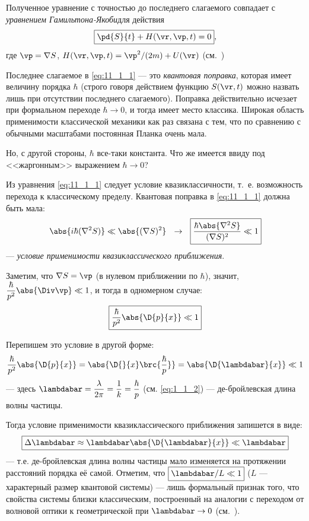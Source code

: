 Полученное уравнение с точностью до последнего слагаемого совпадает с {\em уравнением Гамильтона-Якоби}\footnotemark для действия
$$
\boxed{\pd{S}{t} + H(\vr,\vp,t) = 0},
$$
где $\vp=\nabla S$, $H(\vr,\vp,t) = {\vp^2}/{(2m)} + U(\vr)$ (см.~)

Последнее слагаемое в \eqref{eq:11_1_1} --- это {\em квантовая поправка}, которая имеет величину порядка $\hbar$ (строго говоря действием функцию $S(\vr, t)$ можно назвать лишь при отсутствии последнего слагаемого). Поправка действительно исчезает при формальном переходе $\hbar \to 0$, и тогда имеет место классика. Широкая область применимости классической механики как раз связана с тем, что по сравнению с обычными масштабами постоянная Планка очень мала.

Но, с другой стороны, $\hbar$ все-таки константа. Что же имеется ввиду под <<жаргонным>> выражением $\hbar \to 0$?

Из уравнения \eqref{eq:11_1_1} следует условие квазиклассичности, т.~е. возможность перехода к классическому пределу. Квантовая поправка в \eqref{eq:11_1_1} должна быть мала:
$$
\abs{i\hbar(\nabla^2 S)} \ll \abs{(\nabla S)^2} ~~\rightarrow~~ \boxed{\frac{\hbar \abs{\nabla^2 S}}{(\nabla S)^2} \ll 1} 
$$
--- {\em условие применимости квазиклассического приближения}.

Заметим, что $\nabla S =\vp$ (в нулевом приближении по $\hbar$), значит, ${\dfrac{\hbar}{p^2}\abs{\Div \vp} \ll 1}$, и тогда в одномерном случае:
$$
\boxed{\frac{\hbar}{p^2}\abs{\D{p}{x}} \ll 1}
$$

Перепишем это условие в другой форме:
$$
\frac{\hbar}{p^2} \abs{\D{p}{x}} = 
\abs{\D{}{x}\brc{\frac{\hbar}{p}}} = \abs{\D{\lambdabar}{x}} \ll 1
$$
--- здесь $\lambdabar = \dfrac{\lambda}{2\pi} = \dfrac{1}{k} = \dfrac{\hbar}{p}$ (см. \eqref{eq:1_1_2}) --- де-бройлевская длина волны частицы.

Тогда условие применимости квазиклассического приближения запишется в виде:
$$
\boxed{\Delta \lambdabar \approx \lambdabar \abs{\D{\lambdabar}{x}} \ll \lambdabar}
$$
--- т.е. де-бройлевская длина волны частицы мало изменяется на протяжении расстояний порядка её самой. Отметим, что $\boxed{\lambdabar/L \ll 1}$ ($L$ --- характерный размер квантовой системы) --- лишь формальный признак того, что свойства системы близки  классическим, построенный на аналогии с переходом от волновой оптики к геометрической при $\lambdabar \to 0$ (см.~).


